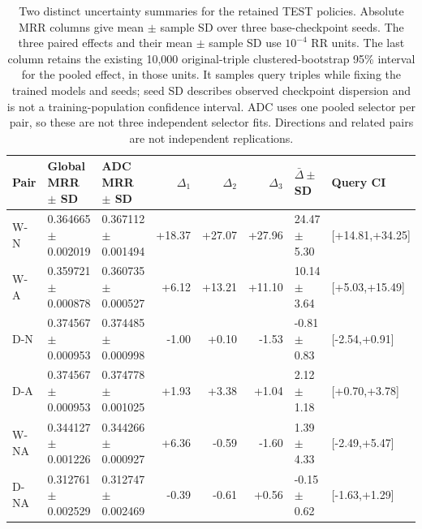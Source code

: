 \begin{table}[htbp]
\centering\footnotesize\setlength{\tabcolsep}{3pt}
\caption{Two distinct uncertainty summaries for the retained TEST policies. Absolute MRR columns give mean $\pm$ sample SD over three base-checkpoint seeds. The three paired effects and their mean $\pm$ sample SD use $10^{-4}$ RR units. The last column retains the existing 10,000 original-triple clustered-bootstrap 95\% interval for the pooled effect, in those units. It samples query triples while fixing the trained models and seeds; seed SD describes observed checkpoint dispersion and is not a training-population confidence interval. ADC uses one pooled selector per pair, so these are not three independent selector fits. Directions and related pairs are not independent replications.}
\label{tab:selection-query-seed}
\begin{tabular}{lllrrrll}
\toprule
Pair & Global MRR $\pm$ SD & ADC MRR $\pm$ SD & $\Delta_1$ & $\Delta_2$ & $\Delta_3$ & $\bar\Delta\pm$ SD & Query CI\\
\midrule
W-N & 0.364665$\pm$0.002019 & 0.367112$\pm$0.001494 & +18.37 & +27.07 & +27.96 & 24.47$\pm$5.30 & [+14.81,+34.25]\\
W-A & 0.359721$\pm$0.000878 & 0.360735$\pm$0.000527 & +6.12 & +13.21 & +11.10 & 10.14$\pm$3.64 & [+5.03,+15.49]\\
D-N & 0.374567$\pm$0.000953 & 0.374485$\pm$0.000998 & -1.00 & +0.10 & -1.53 & -0.81$\pm$0.83 & [-2.54,+0.91]\\
D-A & 0.374567$\pm$0.000953 & 0.374778$\pm$0.001025 & +1.93 & +3.38 & +1.04 & 2.12$\pm$1.18 & [+0.70,+3.78]\\
W-NA & 0.344127$\pm$0.001226 & 0.344266$\pm$0.000927 & +6.36 & -0.59 & -1.60 & 1.39$\pm$4.33 & [-2.49,+5.47]\\
D-NA & 0.312761$\pm$0.002529 & 0.312747$\pm$0.002469 & -0.39 & -0.61 & +0.56 & -0.15$\pm$0.62 & [-1.63,+1.29]\\
\bottomrule
\end{tabular}
\end{table}
